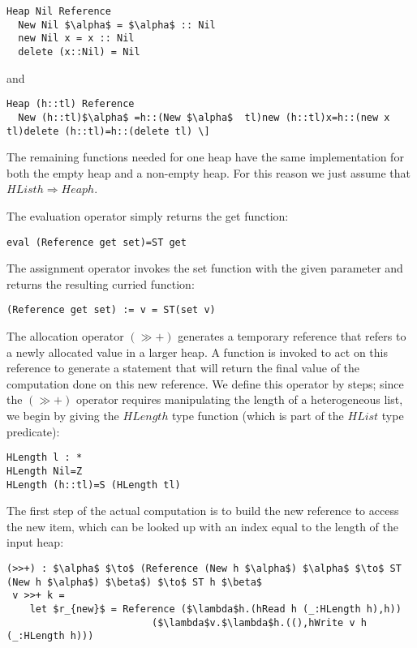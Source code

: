 \documentclass[a4paper]{article}
\begin{document}
\begin{lstlisting}
Heap Nil Reference
  New Nil $\alpha$ = $\alpha$ :: Nil
  new Nil x = x :: Nil
  delete (x::Nil) = Nil
\end{lstlisting}

and

\begin{lstlisting}
Heap (h::tl) Reference
  New (h::tl)$\alpha$ =h::(New $\alpha$  tl)new (h::tl)x=h::(new x tl)delete (h::tl)=h::(delete tl) \] 
\end{lstlisting}

The remaining functions needed for one heap have the same implementation for both the empty heap and a non-empty heap. For this reason we just assume that $HList h\Rightarrow Heap h$.

\noindent The evaluation operator simply returns the get function:

\begin{lstlisting}
eval (Reference get set)=ST get
\end{lstlisting}

The assignment operator invokes the set function with the given parameter and returns the resulting curried function:

\begin{lstlisting}
(Reference get set) := v = ST(set v)
\end{lstlisting}

The allocation operator $(\gg +)$ generates a temporary reference that refers to a newly allocated value in a larger heap. A function is invoked to act on this reference to generate a statement that will return the final value of the computation done on this new reference. We define this operator by steps; since the $(\gg +)$ operator requires manipulating the length of a heterogeneous list, we begin by giving the $HLength$ type function (which is part of the $HList$ type predicate):

\begin{lstlisting}
HLength l : *
HLength Nil=Z
HLength (h::tl)=S (HLength tl)
\end{lstlisting}

The first step of the actual computation is to build the new reference to access the new item, which can be looked up with an index equal to the length of the input heap:

\begin{lstlisting}
(>>+) : $\alpha$ $\to$ (Reference (New h $\alpha$) $\alpha$ $\to$ ST (New h $\alpha$) $\beta$) $\to$ ST h $\beta$
 v >>+ k = 
    let $r_{new}$ = Reference ($\lambda$h.(hRead h (_:HLength h),h))
                         ($\lambda$v.$\lambda$h.((),hWrite v h (_:HLength h)))
\end{lstlisting}
\end{document}
